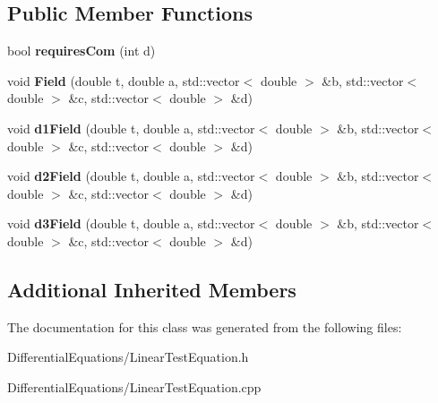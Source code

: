 \subsection*{Public Member Functions}
\begin{DoxyCompactItemize}
\item 
\mbox{\label{classLinearTestEquation_aa7ab524660cc97cbb53fdb78b32dfb9c}} 
bool {\bfseries requires\+Com} (int d)
\item 
\mbox{\label{classLinearTestEquation_ac7be044049da8490289be20fde0ffdb5}} 
void {\bfseries Field} (double t, double a, std\+::vector$<$ double $>$ \&b, std\+::vector$<$ double $>$ \&c, std\+::vector$<$ double $>$ \&d)
\item 
\mbox{\label{classLinearTestEquation_ad9ebdc71f9376029b08de9630b8720ef}} 
void {\bfseries d1\+Field} (double t, double a, std\+::vector$<$ double $>$ \&b, std\+::vector$<$ double $>$ \&c, std\+::vector$<$ double $>$ \&d)
\item 
\mbox{\label{classLinearTestEquation_aeab6902175fda50de3b4a02921f095ea}} 
void {\bfseries d2\+Field} (double t, double a, std\+::vector$<$ double $>$ \&b, std\+::vector$<$ double $>$ \&c, std\+::vector$<$ double $>$ \&d)
\item 
\mbox{\label{classLinearTestEquation_a9ff6bf55ead037c7fe29fbcc81d0fbf2}} 
void {\bfseries d3\+Field} (double t, double a, std\+::vector$<$ double $>$ \&b, std\+::vector$<$ double $>$ \&c, std\+::vector$<$ double $>$ \&d)
\end{DoxyCompactItemize}
\subsection*{Additional Inherited Members}


The documentation for this class was generated from the following files\+:\begin{DoxyCompactItemize}
\item 
Differential\+Equations/Linear\+Test\+Equation.\+h\item 
Differential\+Equations/Linear\+Test\+Equation.\+cpp\end{DoxyCompactItemize}
